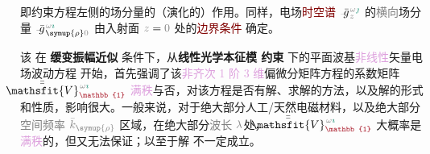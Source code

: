 即约束方程左侧的场分量的（演化的）作用。同样，电场\textcolor{Maroon}{时空谱} $\xint{{}^{}_{\mathcolor{gray}{-}}}{10}{\bar{g}}^{\;\!\mathcolor{gray}{\omega} \textcolor{PineGreen}{\jmath}}_{\;\! \mathcolor{gray}{z}}$ 的\textcolor{gray}{横向}场分量 $\xint{{}^{}_{\mathcolor{gray}{-}}}{10}{\bar{g}}^{\;\!\mathcolor{gray}{\omega} \textcolor{PineGreen}{\imath}}_{\;\! \symup{\rho} \mathcolor{gray}{0}}$ 由入射面 $\mathcolor{gray}{z \mathcolor{black}{=} 0}$ 处的\textcolor{Maroon}{边界条件}  确定。

该  在 \textbf{\textcolor{NavyBlue}{缓变振幅}近似} 条件下，从\textbf{线性光学\textcolor{PineGreen}{本征模}  约束} 下的\textcolor{PineGreen}{平面波基}\textcolor{Plum}{非线性}矢量电场波动方程  开始，首先强调了该\textcolor{Plum}{非齐次} \textcolor{Plum}{1 阶 3 维}偏微分矩阵方程的系数矩阵 $\xint{\mathcolor{gray}{-}}{25}{\bar{\bar{\mathsfit{V}}}}^{\;\! \mathcolor{gray}{\omega} \textcolor{PineGreen}{\imath}}_{\textcolor{Maroon}{\mathbb{1}}}$ \textcolor{Plum}{满秩}与否，对该方程是否有解、求解的方法，以及解的形式和性质，影响很大。一般来说，对于绝大部分人工/天然电磁材料，以及绝大部分\textcolor{gray}{空间频率} $\mathcolor{gray}{\bar{k}_{\symup{\rho}}}$ 区域，在绝大部分\textcolor{gray}{波长} $\mathcolor{gray}{\lambda}$处，$\xint{\mathcolor{gray}{-}}{25}{\bar{\bar{\mathsfit{V}}}}^{\;\! \mathcolor{gray}{\omega} \textcolor{PineGreen}{\imath}}_{\textcolor{Maroon}{\mathbb{1}}}$ 大概率是\textcolor{Plum}{满秩}的，但又无法保证；以至于解  不一定成立。

